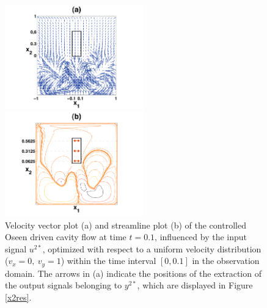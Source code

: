 \documentclass[a4paper,10pt,BCOR=15mm]{scrbook}
\begin{document}
\begin{figure}[htbp]
  \centering
  \begin{minipage}[b]{6 cm}
    \includegraphics[width=6cm]{pics/fullOpti/new/vear_x2.pdf}
  \end{minipage}
  \begin{minipage}[b]{6 cm}
    \includegraphics[width=6cm]{pics/fullOpti/new/stli_x2.pdf}
  \end{minipage}
   \caption{Velocity vector plot (a) and streamline plot (b) of the controlled Oseen driven cavity flow at time $t=0.1$, influenced by the input signal $u^{2*}$, optimized with respect to a uniform velocity distribution ($v_x = 0,~v_y=1$) within the time interval $[0,0.1]$ in the observation domain. The arrows in (a) indicate the positions of the extraction of the output signals belonging to $y^{2*}$, which are displayed in Figure \ref{x2res}.} 
\label{x2vest}
\end{figure}
\end{document}
